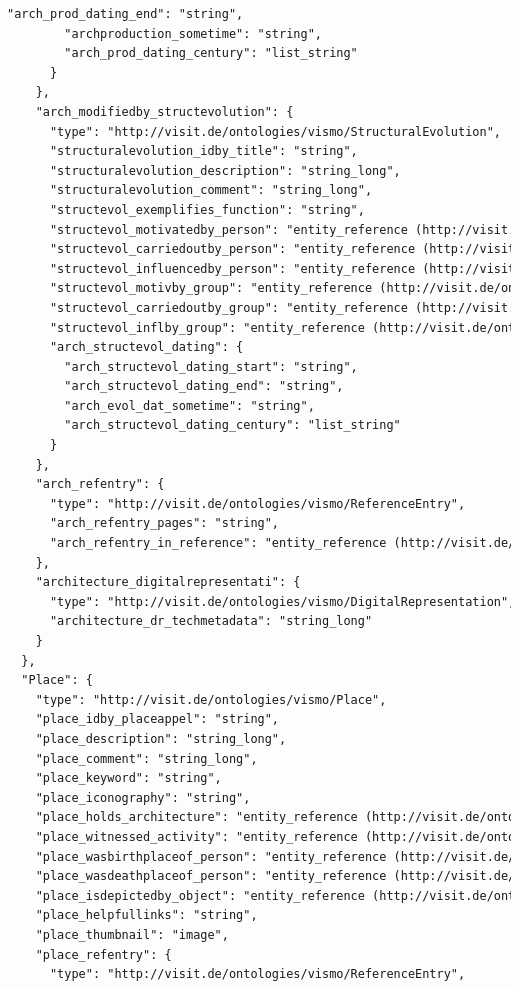\begin{lstlisting}[caption={JSON \q{Schema} der ViSIT Daten, die über die REST API ausgespielt werden.},label={lst:json},captionpos=b,language=xml]
        "arch_prod_dating_end": "string",
        "archproduction_sometime": "string",
        "arch_prod_dating_century": "list_string"
      }
    },
    "arch_modifiedby_structevolution": {
      "type": "http://visit.de/ontologies/vismo/StructuralEvolution",
      "structuralevolution_idby_title": "string",
      "structuralevolution_description": "string_long",
      "structuralevolution_comment": "string_long",
      "structevol_exemplifies_function": "string",
      "structevol_motivatedby_person": "entity_reference (http://visit.de/ontologies/vismo/Person)",
      "structevol_carriedoutby_person": "entity_reference (http://visit.de/ontologies/vismo/Person)",
      "structevol_influencedby_person": "entity_reference (http://visit.de/ontologies/vismo/Person)",
      "structevol_motivby_group": "entity_reference (http://visit.de/ontologies/vismo/Group)",
      "structevol_carriedoutby_group": "entity_reference (http://visit.de/ontologies/vismo/Group)",
      "structevol_inflby_group": "entity_reference (http://visit.de/ontologies/vismo/Group)",
      "arch_structevol_dating": {
        "arch_structevol_dating_start": "string",
        "arch_structevol_dating_end": "string",
        "arch_evol_dat_sometime": "string",
        "arch_structevol_dating_century": "list_string"
      }
    },
    "arch_refentry": {
      "type": "http://visit.de/ontologies/vismo/ReferenceEntry",
      "arch_refentry_pages": "string",
      "arch_refentry_in_reference": "entity_reference (http://visit.de/ontologies/vismo/Reference)"
    },
    "architecture_digitalrepresentati": {
      "type": "http://visit.de/ontologies/vismo/DigitalRepresentation",
      "architecture_dr_techmetadata": "string_long"
    }
  },
  "Place": {
    "type": "http://visit.de/ontologies/vismo/Place",
    "place_idby_placeappel": "string",
    "place_description": "string_long",
    "place_comment": "string_long",
    "place_keyword": "string",
    "place_iconography": "string",
    "place_holds_architecture": "entity_reference (http://visit.de/ontologies/vismo/Architecture)",
    "place_witnessed_activity": "entity_reference (http://visit.de/ontologies/vismo/Activity)",
    "place_wasbirthplaceof_person": "entity_reference (http://visit.de/ontologies/vismo/Person)",
    "place_wasdeathplaceof_person": "entity_reference (http://visit.de/ontologies/vismo/Person)",
    "place_isdepictedby_object": "entity_reference (http://visit.de/ontologies/vismo/Object)",
    "place_helpfullinks": "string",
    "place_thumbnail": "image",
    "place_refentry": {
      "type": "http://visit.de/ontologies/vismo/ReferenceEntry",

\end{lstlisting}
